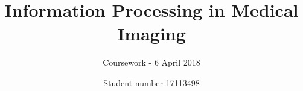 \documentclass[runningheads]{llncs}
\begin{document}
%
\title{Information Processing in Medical Imaging}
\subtitle{Coursework - 6 April 2018}
%
%
\author{Student number 17113498 }
%
%
%
\maketitle              %







%
%
%


\end{document}
